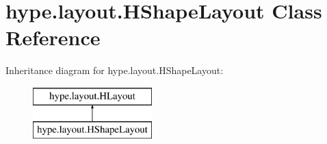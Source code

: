 \hypertarget{classhype_1_1layout_1_1_h_shape_layout}{\section{hype.\-layout.\-H\-Shape\-Layout Class Reference}
\label{classhype_1_1layout_1_1_h_shape_layout}
}
Inheritance diagram for hype.\-layout.\-H\-Shape\-Layout\-:\begin{figure}[H]
\begin{center}
\leavevmode
\includegraphics[height=2.000000cm]{classhype_1_1layout_1_1_h_shape_layout}
\end{center}
\end{figure}
